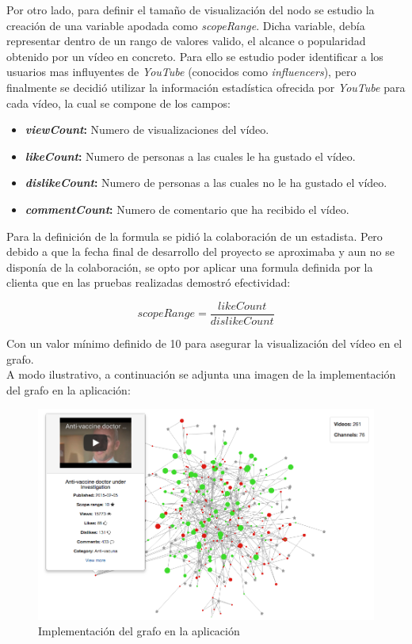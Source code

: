 \documentclass[11pt,a4paper]{article}
\begin{document}
Por otro lado, para definir el tamaño de visualización del nodo se estudio la creación de una variable apodada como \textit{scopeRange}. Dicha variable, debía representar dentro de un rango de valores valido, el alcance o popularidad obtenido por un vídeo en concreto. Para ello se estudio poder identificar a los usuarios mas influyentes de \textit{YouTube} (conocidos como \textit{influencers}), pero finalmente se decidió utilizar la información estadística ofrecida por \textit{YouTube} para cada vídeo, la cual se compone de los campos:
\begin{itemize}
\item \textbf{\textit{viewCount}:} Numero de visualizaciones del vídeo.
\item \textbf{\textit{likeCount}:} Numero de personas a las cuales le ha gustado el vídeo.
\item \textbf{\textit{dislikeCount}:} Numero de personas a las cuales no le ha gustado el vídeo.
\item \textbf{\textit{commentCount}:} Numero de comentario que ha recibido el vídeo.
\end{itemize}

Para la definición de la formula se pidió la colaboración de un estadista. Pero debido a que la fecha final de desarrollo del proyecto se aproximaba y aun no se disponía de la colaboración, se opto por aplicar una formula definida por la clienta que en las pruebas realizadas demostró efectividad:
\begin{center}
$$scopeRange = \frac{likeCount}{dislikeCount}$$
\end{center}
Con un valor mínimo definido de 10 para asegurar la visualización del vídeo en el grafo.
\\

A modo ilustrativo, a continuación se adjunta una imagen de la implementación del grafo en la aplicación:
\begin{figure}[H]
\centering
\includegraphics[scale=0.40]{grafo/final.png}
\caption{Implementación del grafo en la aplicación}
\end{figure}
\medskip 
\end{document}
